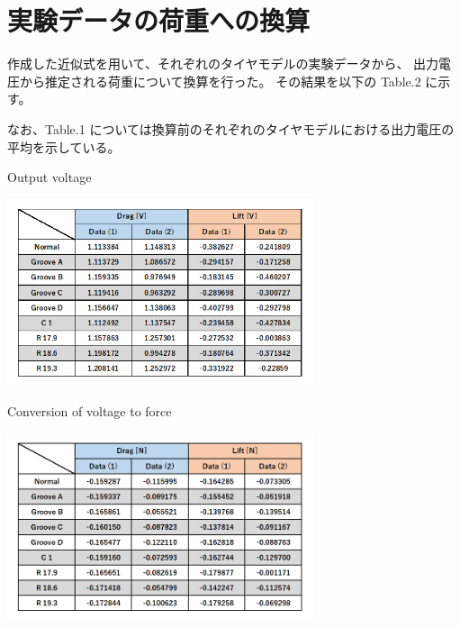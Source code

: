 \documentclass[twocolumn,a4j]{jsarticle}
\begin{document}
\section{実験データの荷重への換算}
作成した近似式を用いて、それぞれのタイヤモデルの実験データから、
出力電圧から推定される荷重について換算を行った。
その結果を以下の Table.2 に示す。\par
なお、Table.1 については換算前のそれぞれのタイヤモデルにおける出力電圧の平均を示している。
\begin{table}[htbp]
    \footnotesize
    \begin{center}
        \caption{Output voltage}
        \includegraphics[width=90mm]{images/Table_1.png}
        \caption{Conversion of voltage to force}
        \includegraphics[width=90mm]{images/Table_2.png}
    \end{center}
\end{table}
\end{document}
